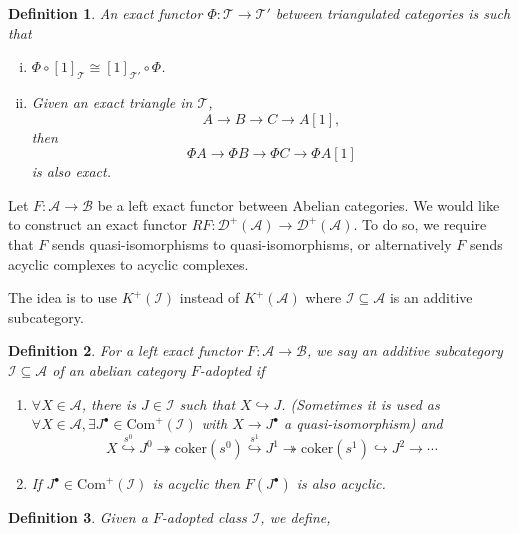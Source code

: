 \documentclass[10pt]{article}
\numberwithin{equation}{section}
\newtheorem{definition}{Definition}[section]
\newcommand{\cK}[0]{\mathcal{K}}
\newcommand{\cD}[0]{\mathcal{D}}
\newcommand{\sA}[0]{\mathscr{A}}
\newcommand{\sB}[0]{\mathscr{B}}
\newcommand{\sI}[0]{\mathscr{I}}
\newcommand{\sT}[0]{\mathscr{T}}
\newcommand{\Com}[0]{\mathrm{Com}}
\newcommand{\coker}[0]{\mathrm{coker}}
\begin{document}
\begin{definition}
    An exact functor $\Phi:\sT\to\sT'$ between triangulated categories is such that 
    \begin{enumerate}[i.]
        \item $\Phi\circ[1]_{\sT}\cong [1]_{\sT'}\circ\Phi$.
        \item Given an exact triangle in $\sT$,
        \begin{equation*}
            A\to B\to C\to A[1],
        \end{equation*}
        then 
        \begin{equation*}
            \Phi A\to\Phi B\to \Phi C\to \Phi A[1]
        \end{equation*}
        is also exact.
    \end{enumerate}
\end{definition}

Let $F:\sA\to\sB$ be a left exact functor between Abelian categories. We would like to construct an exact functor $RF:\cD^+(\sA)\to\cD^+(\sA)$. 
To do so, we require that $F$ sends quasi-isomorphisms to quasi-isomorphisms, or alternatively $F$ sends acyclic complexes to acyclic complexes.

The idea is to use $K^+(\mathscr{I})$ instead of $K^+(\sA)$ where $\mathscr{I}\subseteq\sA$ is an additive subcategory.

\begin{definition}
    For a left exact functor $F:\sA\to \sB$, we say an additive subcategory $\mathscr{I}\subseteq\sA$ of an abelian category $F$-adopted if 
    \begin{enumerate}
        \item $\forall X\in\sA$, there is $J\in \mathscr{I}$ such that $X\hookrightarrow J$. (Sometimes it is used as $\forall X\in\sA,\exists J^\bullet\in\Com^+(\sI)$ with $X\to J^\bullet$ a quasi-isomorphism) and 
        \begin{equation*}
            X\stackrel{s^0}{\hookrightarrow} J^0\twoheadrightarrow\coker(s^0)\stackrel{s^1}{\hookrightarrow} J^1\twoheadrightarrow\coker(s^1)\hookrightarrow J^2\to\cdots
        \end{equation*}
        \item If $J^\bullet\in\Com^+(\sI)$ is acyclic then $F(J^\bullet)$ is also acyclic.
    \end{enumerate}
\end{definition}

\begin{definition}
    Given a $F$-adopted class $\sI$, we define,
\begin{center}
\end{center}
\end{definition}
\end{document}
